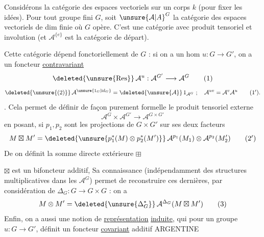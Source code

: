Considérons la catégorie des espaces vectoriels  sur un corps $k$
(pour fixer les idées). Pour tout groupe fini $G$, soit
${\unsure{\mathcal A|A}}^G$ la catégorie des espaces vectoriels de dim finie où
$G$ opère. C'est  une catégorie avec produit
tensoriel  et involution  (et $\mathcal A^{\{e\}}$ est la catégorie de départ).


Cette catégorie dépend fonctoriellement de $G$ : si on a
un hom $u:G\longrightarrow G'$, on a un foncteur \uline{contravariant}
\[
\deleted{\unsure{\mathrm{Res}}}\,\mathcal A^u:\mathcal A^{G'}\longrightarrow\mathcal A^G \tag*{(1)}
\]
\[
\deleted{\unsure{(2)}}\,\mathcal A^{\unsure{1_G|\mathrm{id}_G}}=\deleted{\unsure{\mathcal A}}\,1_{\mathcal A^G}\ ;\quad \mathcal A^{uv}=\mathcal A^v\mathcal A^u \tag*{$(1')$.}
\]
. Cela permet de définir de façon purement
formelle le produit tensoriel externe
\[
\mathcal A^G\times\mathcal A^{G'}\longrightarrow\mathcal A^{G\times G'} \tag*{(2)}
\]
en posant, si $p_1,p_2$ sont les projections de $G\times G'$ sur ses
deux facteurs
\[
M\boxtimes M'=\deleted{\unsure{p_1^*(M)\otimes p_2^*(M')}}\,\mathcal A^{p_1}(M_1)\otimes\mathcal A^{p_2}(M'_2) \tag*{$(2')$}
\]
De  on définit la somme directe extérieure $\boxplus$

$\boxtimes$ est un bifoncteur additif,  Sa connaissance
(indépendamment des structures multiplicatives dans les
$\mathcal A^G$) permet de reconstruire ces dernières, par
considération de $\Delta_G:G\longrightarrow G\times G$ : on a
\[
M\otimes M'=\deleted{\unsure{\Delta_G^*}}\,\mathcal A^{\Delta_G}(M\boxtimes M') \tag*{(3)}
\]
Enfin, on a aussi une notion de \uline{représentation}
\uline{induite}, qui pour un groupe  
$u:G\longrightarrow G'$, définit un foncteur \uline{covariant} additif
  ARGENTINE  
